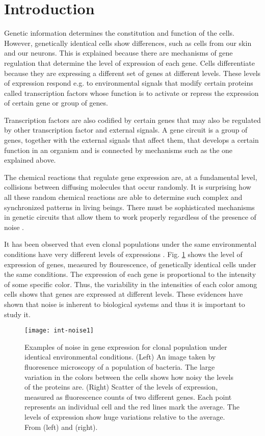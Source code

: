 \chapter*{Introduction}
\renewcommand{\thefigure}{I.\arabic{figure}}

Genetic information determines the constitution and function of the cells. However, genetically identical cells show differences, such as cells from our skin and our neurons. This is explained because there are mechanisms of gene regulation that determine the level of expression of each gene. Cells differentiate because they are expressing a different set of genes at different levels. These levels of expression respond e.g. to environmental signals that modify certain proteins called transcription factors whose function is to activate or repress the expression of certain gene or group of genes.

Transcription factors are also codified by certain genes that may also be regulated by other transcription factor and external signals. A gene circuit is a group of genes, together with the external signals that affect them, that develops a certain function in an organism and is connected by mechanisms such as the one explained above.

The chemical reactions that regulate gene expression are, at a fundamental level, collisions between diffusing molecules that occur randomly. It is surprising how all these random chemical reactions are able to determine such complex and synchronized patterns in living beings. There must be sophisticated mechanisms in genetic circuits that allow them to work properly regardless of the presence of noise \cite{kaern05} \cite{raj08}.

It has been observed that even clonal populations under the same environmental conditions have very different levels of expressions \cite{elowitz02} \cite{pedraza05}. Fig. \ref{fig:int-noise1} shows the level of expression of genes, measured by flourescence, of genetically identical cells under the same conditions. The expression of each gene is proportional to the intensity of some specific color. Thus, the variability in the intensities of each color among cells shows that genes are expressed at different levels. These evidences have shown that noise is inherent to biological systems and thus it is important to study it.

\begin{figure}[H]
  \centering
  \texttt{[image: int-noise1]}
  \caption[Examples of noise in gene expression]{\label{fig:int-noise1}Examples of noise in gene expression for clonal population under identical environmental conditions. (Left) An image taken by fluoresence microscopy of a population of bacteria. The large variation in the colors between the cells shows how noisy the levels of the proteins are. (Right) Scatter of the levels of expression, measured as fluorescence counts of two different genes. Each point represents an individual cell and the red lines mark the average. The levels of expression show huge variations relative to the average. From \cite{elowitz02} (left) and \cite{pedraza05} (right).}
\end{figure}

